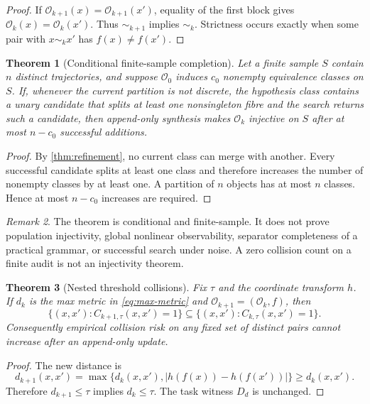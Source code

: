 \documentclass[10pt]{article}
\newtheorem{theorem}{Theorem}[section]
\theoremstyle{definition}
\theoremstyle{remark}
\newtheorem{remark}[theorem]{Remark}
\newcommand{\Obs}{\mathcal O}
\begin{document}
\begin{proof}
If $\Obs_{k+1}(x)=\Obs_{k+1}(x')$, equality of the first block gives $\Obs_k(x)=\Obs_k(x')$. Thus $\sim_{k+1}$ implies $\sim_k$. Strictness occurs exactly when some pair with $x\sim_k x'$ has $f(x)\ne f(x')$.
\end{proof}

\begin{theorem}[Conditional finite-sample completion]
\label{thm:completion}
Let a finite sample $S$ contain $n$ distinct trajectories, and suppose $\Obs_0$ induces $c_0$ nonempty equivalence classes on $S$. If, whenever the current partition is not discrete, the hypothesis class contains a unary candidate that splits at least one nonsingleton fibre and the search returns such a candidate, then append-only synthesis makes $\Obs_k$ injective on $S$ after at most $n-c_0$ successful additions.
\end{theorem}

\begin{proof}
By \cref{thm:refinement}, no current class can merge with another. Every successful candidate splits at least one class and therefore increases the number of nonempty classes by at least one. A partition of $n$ objects has at most $n$ classes. Hence at most $n-c_0$ increases are required.
\end{proof}

\begin{remark}
The theorem is conditional and finite-sample. It does not prove population injectivity, global nonlinear observability, separator completeness of a practical grammar, or successful search under noise. A zero collision count on a finite audit is not an injectivity theorem.
\end{remark}

\begin{theorem}[Nested threshold collisions]
\label{thm:nesting}
Fix $\tau$ and the coordinate transform $h$. If $d_k$ is the max metric in \cref{eq:max-metric} and $\Obs_{k+1}=(\Obs_k,f)$, then
\begin{equation}
  \{(x,x'):C_{k+1,\tau}(x,x')=1\}
  \subseteq
  \{(x,x'):C_{k,\tau}(x,x')=1\}.
  \label{eq:nesting}
\end{equation}
Consequently empirical collision risk on any fixed set of distinct pairs cannot increase after an append-only update.
\end{theorem}

\begin{proof}
The new distance is
\[
d_{k+1}(x,x')=\max\{d_k(x,x'),|h(f(x))-h(f(x'))|\}\ge d_k(x,x').
\]
Therefore $d_{k+1}\le\tau$ implies $d_k\le\tau$. The task witness $D_d$ is unchanged.
\end{proof}
\end{document}
